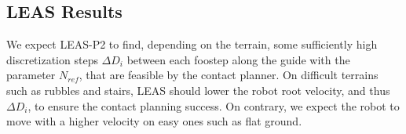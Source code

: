 \subsection{LEAS Results}
\label{subsub:mip:results}





We expect LEAS-P2 to find, depending on the terrain, some sufficiently high discretization steps $\Delta D_i$ between each foostep along the guide with the parameter $N_{ref}$, that are feasible by the contact planner.
On difficult terrains such as rubbles and stairs, LEAS should lower the robot root velocity, and thus $\Delta D_i$, to ensure the contact planning success. 
On contrary, we expect the robot to move with a higher velocity on easy ones such as flat ground.



